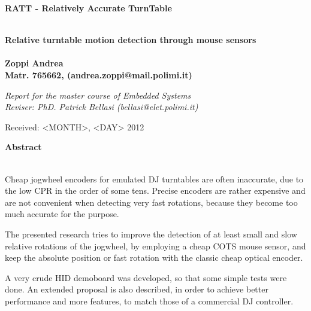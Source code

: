 \documentclass[a4paper,10pt]{article}
\newenvironment*{mytitle}{\begin{LARGE}\bf}{\end{LARGE}\\}%
\newenvironment*{mysubtitle}{\bf}{\\[1.5ex]}%
\newenvironment*{myabstract}{\begin{Large}\bf}{\end{Large}\\[2.5ex]}%
\begin{document}
\newcommand{\ttDiscDiam}{12.00}
\newcommand{\ttNomAngSpeed}{33.00}
\newcommand{\ttPitchOff}{0.00}
\newcommand{\ttDiscPerim}{37.70}
\newcommand{\ttAngSpeed}{33.00}
\newcommand{\ttRevRate}{0.550}
\newcommand{\ttRevTime}{1.818}
\newcommand{\ttTgSpeed}{20.73}
		
\newcommand{\ssRes}{2000}
\newcommand{\ssMaxSpeed}{30}
\newcommand{\ssMaxDotRate}{60000}
\newcommand{\ssMaxDotsOneMs}{60}
		
\newcommand{\mmRadius}{4.00}
\newcommand{\mmAngleOff}{0.00}
\newcommand{\mmRadiusCm}{10.16}
\newcommand{\mmSpeed}{13.82}
\newcommand{\mmDotRate}{27646}
\newcommand{\mmRevDots}{50265}



\begin{mytitle}RATT	- Relatively Accurate TurnTable\end{mytitle}
\begin{mysubtitle}Relative turntable motion detection through mouse sensors\end{mysubtitle}
\\
Zoppi Andrea\\
Matr. 765662, (andrea.zoppi@mail.polimi.it)\\
\begin{flushright}
\emph{Report for the master course of Embedded Systems}\\
\emph{Reviser: PhD. Patrick Bellasi (bellasi@elet.polimi.it)}
\end{flushright}

Received: <MONTH>, <DAY> 2012\\
\hspace{10ex}

\begin{myabstract} Abstract \end{myabstract}
Cheap jogwheel encoders for emulated DJ turntables are often inaccurate, due
to the low CPR in the order of some tens. Precise encoders are rather expensive
and are not convenient when detecting very fast rotations, because they become
too much accurate for the purpose.

The presented research tries to improve the detection of at least small and
slow relative rotations of the jogwheel, by employing a cheap COTS mouse sensor,
and keep the absolute position or fast rotation with the classic cheap optical
encoder.

A very crude HID demoboard was developed, so that some simple tests were done.
An extended proposal is also described, in order to achieve better performance
and more features, to match those of a commercial DJ controller.
\end{document}
